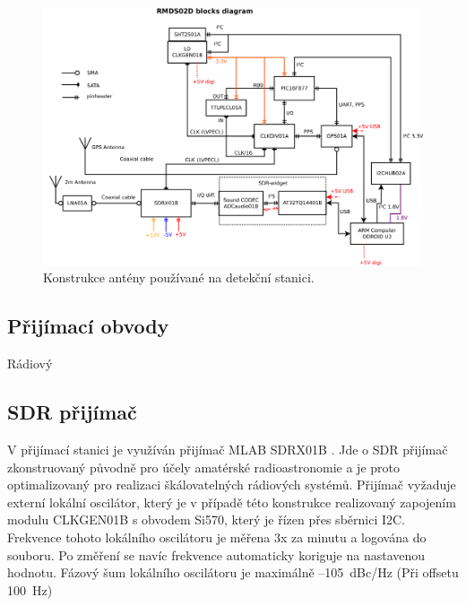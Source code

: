 \documentclass[12pt,a4paper,oneside]{article}
\begin{document}
\begin{figure}[htbp]
\begin{center}
\includegraphics [width=120mm] {../../SCH/RMDS02D_system.png} 
\end{center}
\caption{Konstrukce antény používané na detekční stanici.}
\end{figure}


\subsection{Přijímací obvody}

Rádiový


\subsection{SDR přijímač}

V přijímací stanici je využíván přijímač MLAB SDRX01B \cite{SDRX01B_pdf}. Jde o SDR přijímač zkonstruovaný původně pro účely amatérské radioastronomie a je proto optimalizovaný pro realizaci škálovatelných rádiových systémů. Přijímač vyžaduje externí lokální oscilátor, který je v případě této konstrukce realizovaný zapojením modulu CLKGEN01B s obvodem Si570, který je řízen přes sběrnici I2C.  Frekvence tohoto lokálního oscilátoru je měřena 3x za minutu a logována do souboru. Po změření se navíc frekvence automaticky koriguje na nastavenou hodnotu. Fázový šum lokálního oscilátoru je maximálně –105~dBc/Hz (Při offsetu 100~Hz)
\end{document}
